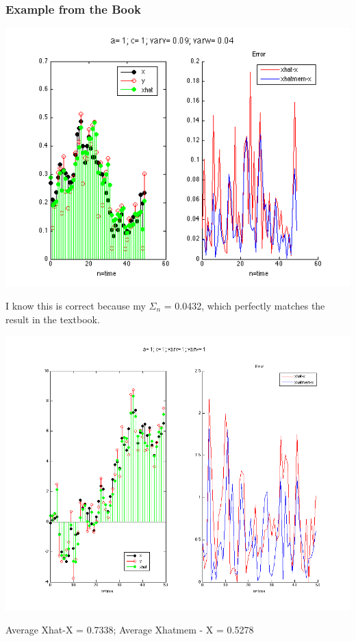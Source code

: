 \documentclass[leqno]{article}
\begin{document}
\subsubsection{Example from the Book}
\begin{center}\includegraphics[scale=0.7]{fig1.png}\end{center}

I know this is correct because my $\Sigma_n$ = 0.0432, which perfectly matches the result in the textbook.\\

\begin{center}\includegraphics[scale=0.4]{fig2.png}\end{center}
Average Xhat-X = 0.7338; \quad Average Xhatmem - X = 0.5278
\end{document}
